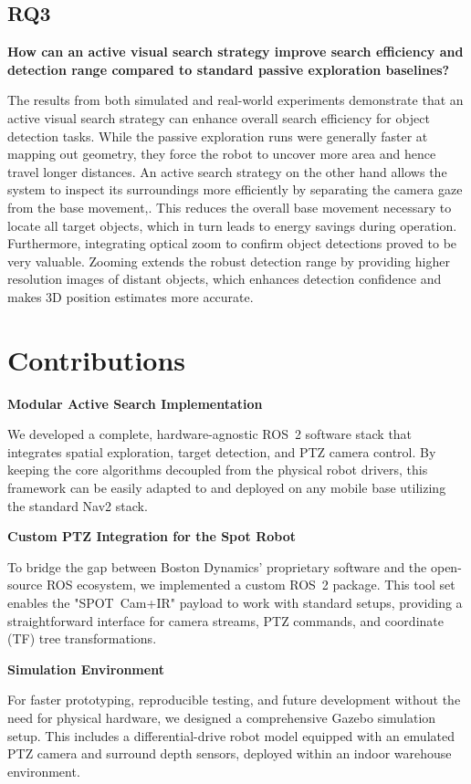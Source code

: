 \documentclass[
	parspace, %
	noindent, %
	final, %
]{elteikthesis}
\begin{document}
\subsection{RQ3}
\textbf{How can an active visual search strategy improve search efficiency and detection range compared to standard passive exploration baselines?}

The results from both simulated and real-world experiments demonstrate that an active visual search strategy can enhance overall search efficiency for object detection tasks. While the passive exploration runs were generally faster at mapping out geometry, they force the robot to uncover more area and hence travel longer distances.  An active search strategy on the other hand allows the system to inspect its surroundings more efficiently by separating the camera gaze from the base movement,. This reduces the overall base movement necessary to locate all target objects, which in turn leads to energy savings during operation. Furthermore, integrating optical zoom to confirm object detections proved to be very valuable. Zooming extends the robust detection range by providing higher resolution images of distant objects, which enhances detection confidence and makes 3D position estimates more accurate.

\section{Contributions}

\textbf{Modular Active Search Implementation}

We developed a complete, hardware-agnostic ROS~2 software stack that integrates spatial exploration, target detection, and PTZ camera control. By keeping the core algorithms decoupled from the physical robot drivers, this framework can be easily adapted to and deployed on any mobile base utilizing the standard Nav2 stack.
    
\textbf{Custom PTZ Integration for the Spot Robot}

To bridge the gap between Boston Dynamics' proprietary software and the open-source ROS ecosystem, we implemented a custom ROS~2 package. This tool set enables the "SPOT~Cam+IR" payload to work with standard setups, providing a straightforward interface for camera streams, PTZ commands, and coordinate (TF) tree transformations.

\textbf{Simulation Environment}

For faster prototyping, reproducible testing, and future development without the need for physical hardware, we designed a comprehensive Gazebo simulation setup. This includes a differential-drive robot model equipped with an emulated PTZ camera and surround depth sensors, deployed within an indoor warehouse environment.
\end{document}
